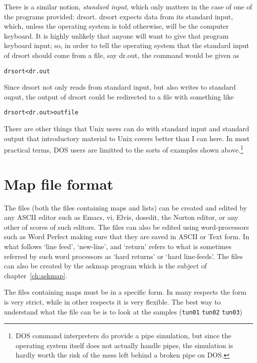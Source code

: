 \documentclass[%
	11pt,
        a4paper,
        twoside]{workrep}
\newcommand*{\prg}[1]{\textsf{#1}}		%
\newcommand*{\file}[1]{\texttt{#1}}		%
\newcommand*{\nt}[1]{\textit{#1}}		%
\begin{document}
There is a similar notion, \nt{standard input}, which only matters
in the case of one of the programs provided: \prg{drsort}.  \prg{drsort}
expects data from its standard input, which, unless the operating system
is told otherwise, will be the computer keyboard.  It is highly unlikely
that anyone will want to give that program keyboard input; so, in order
to tell the operating system that the standard input of \prg{drsort} should
come from a file, say \prg{dr.out}, the command would be given as
\begin{alltt}
  drsort < dr.out
\end{alltt}
Since \prg{drsort} not only reads from standard input, but also writes
to standard ouput, the output of \prg{drsort} could be redirected
to a file with something like
\begin{alltt}
  drsort < dr.out > \texttt{outfile}
\end{alltt}

There are other things that Unix users can do with standard input
and standard output that introductory material to Unix covers
better than I can here.  In most practical terms, DOS users are limitted
to the sorts of examples shown above.\footnote{%
  DOS command interpreters do provide a pipe simulation, but since the
  operating system itself does not actually handle pipes, the simulation is
  hardly worth the risk of the mess left behind a broken pipe on DOS.}


\section{Map file format} \label{sec:mapfile}

The files (both the files containing maps and lists) can be created
and edited by any ASCII editor such as \prg{Emacs}, \prg{vi},
\prg{Elvis}, \prg{dosedit}, the \prg{Norton editor}, or any other of
scores of such editors.  The files can also be edited using
word-processors such as \prg{Word Perfect} making sure that they are saved
in ASCII or Text form.  In what follows `line feed', `new-line', and
`return' refers to what is sometimes referred by such word processors
as `hard returns' or `hard line-feeds'.
The files can also be created by the \prg{askmap} program which is
the subject of chapter~\ref{ch:askmap}.

The files containing maps must be in a specific form.  In many
respects the form is very strict, while in other respects it is very
flexible.  The best way to understand what the file can be is to look
at the samples (\file{tun01} \file{tun02} \file{tun03})
\end{document}
